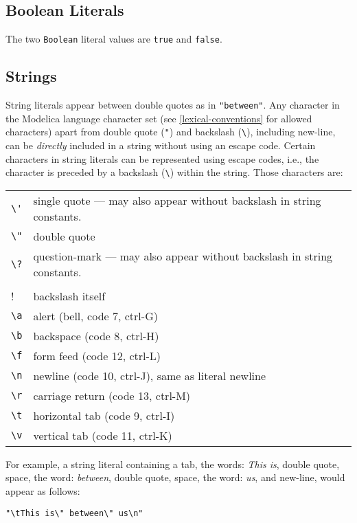 \subsection{Boolean Literals}

The two \lstinline!Boolean! literal values are \lstinline!true! and \lstinline!false!.

\subsection{Strings}

String literals appear between double quotes as in \lstinline!"between"!. Any
character in the Modelica language character set (see \autoref{lexical-conventions} for
allowed characters) apart from double quote (\lstinline!"!) and backslash
(\lstinline!\!), including new-line, can be \emph{directly} included
in a string without using an escape code. Certain characters in string
literals can be represented using escape codes, i.e., the character is
preceded by a backslash (\lstinline!\!) within the string. Those
characters are:
\begin{longtable}[c]{@{}ll@{}}
\lstinline!\'! & single quote --- may also appear without backslash in string constants.\\
\lstinline!\"! & double quote\\
\lstinline!\?! & question-mark --- may also appear without backslash in string constants.\\
\lstinline!\\! & backslash itself\\
\lstinline!\a! & alert (bell, code 7, ctrl-G)\\
\lstinline!\b! & backspace (code 8, ctrl-H)\\
\lstinline!\f! & form feed (code 12, ctrl-L)\\
\lstinline!\n! & newline (code 10, ctrl-J), same as literal newline\\
\lstinline!\r! & carriage return (code 13, ctrl-M)\\
\lstinline!\t! & horizontal tab (code 9, ctrl-I)\\
\lstinline!\v! & vertical tab (code 11, ctrl-K)\\
\end{longtable}

For example, a string literal containing a tab, the words: \emph{This is},
double quote, space, the word: \emph{between}, double quote, space, the word:
\emph{us}, and new-line, would appear as follows:
\begin{lstlisting}[language=modelica]
"\tThis is\" between\" us\n"
\end{lstlisting}

